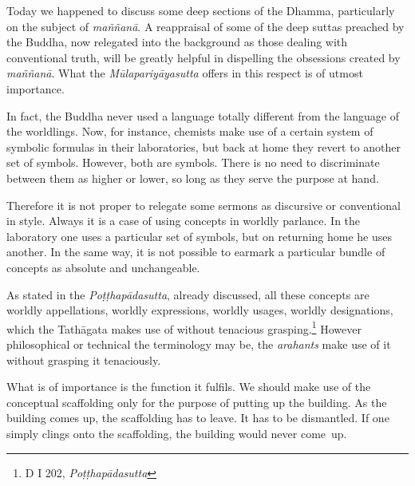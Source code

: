 Today we happened to discuss some deep sections of the Dhamma, particularly on the subject of \emph{maññanā}. A reappraisal of some of the deep suttas preached by the Buddha, now relegated into the background as those dealing with conventional truth, will be greatly helpful in dispelling the obsessions created by \emph{maññanā}. What the \emph{Mūlapariyāyasutta} offers in this respect is of utmost importance.

In fact, the Buddha never used a language totally different from the language of the worldlings. Now, for instance, chemists make use of a certain system of symbolic formulas in their laboratories, but back at home they revert to another set of symbols. However, both are symbols. There is no need to discriminate between them as higher or lower, so long as they serve the purpose at hand.

Therefore it is not proper to relegate some sermons as discursive or conventional in style. Always it is a case of using concepts in worldly parlance. In the laboratory one uses a particular set of symbols, but on returning home he uses another. In the same way, it is not possible to earmark a particular bundle of concepts as absolute and unchangeable.

As stated in the \emph{Poṭṭhapādasutta}, already discussed, all these concepts are worldly appellations, worldly expressions, worldly usages, worldly designations, which the Tathāgata makes use of without tenacious grasping.\footnote{D I 202, \emph{Poṭṭhapādasutta}} However philosophical or technical the terminology may be, the \emph{arahants} make use of it without grasping it tenaciously.

What is of importance is the function it fulfils. We should make use of the conceptual scaffolding only for the purpose of putting up the building. As the building comes up, the scaffolding has to leave. It has to be dismantled. If one simply clings onto the scaffolding, the building would never come~up.
